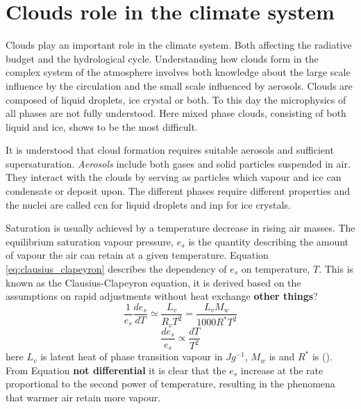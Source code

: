 \section{Clouds role in the climate system} \label{sec:cloud_in_climate_system}
Clouds play an important role in the climate system. Both affecting the radiative budget and the hydrological cycle. Understanding how clouds form in the complex system of the atmosphere involves both knowledge about the large scale influence by the circulation and the small scale influenced by aerosols. Clouds are composed of liquid droplets, ice crystal or both. To this day the microphysics of all phases are not fully understood. Here mixed phase clouds, consisting of both liquid and ice, shows to be the most difficult. 

It is understood that cloud formation requires suitable aerosols and sufficient supersaturation. \textit{Aerosols} include both gases and solid particles suspended in air. They interact with the clouds by serving as particles which vapour and ice can condensate or deposit upon. The different phases require different properties and the nuclei are called \acrfull{ccn} for liquid droplets and \acrfull{inp} for ice crystals. 

Saturation is usually achieved by a temperature decrease in rising air masses. The equilibrium saturation vapour pressure, $e_s$ is the quantity describing the amount of vapour the air can retain at a given temperature. Equation \eqref{eq:clausius_clapeyron} describes the dependency of $e_s$ on temperature, $T$. This is known as the Clausius-Clapeyron equation, it is derived based on the assumptions on rapid adjustments without heat exchange \textbf{other things}?
\begin{equation} \label{eq:clausius_clapeyron}
    \frac{1}{e_s} \frac{de_s}{dT} \simeq \frac{L_v}{R_v T^2} = \frac{L_v M_w}{1000R^*T^2}
\end{equation}
\begin{equation} \label{eq:clausius_clapeyron_prop}
     \frac{de_s}{e_s} \propto \frac{dT}{T^2} 
\end{equation}
here $L_v$ is latent heat of phase transition vapour in $J g^{-1}$, $M_w$ is and $R^*$ is (\cite{cloud_phys_book_johanne}). From Equation \textbf{not differential} it is clear that the $e_s$ increase at the rate proportional to the second power of temperature, resulting in the phenomena that warmer air retain more vapour.

